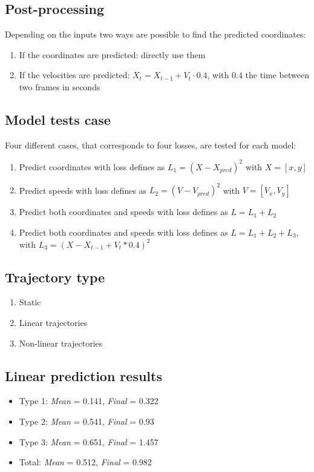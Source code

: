 \documentclass[a0,portrait]{a0poster}
\begin{document}
\begin{multicols}{2}
\subsection*{Post-processing}
Depending on the inputs two ways are possible to find the predicted coordinates:
\begin{enumerate}
\justifying
\item If the coordinates are predicted: directly use them
\item If the velocities are predicted: $X_{t} = X_{t-1} + V_{t}\cdot 0.4$, with $0.4$ the time between two frames in seconds
\end{enumerate}

\subsection*{Model tests case}
Four different cases, that corresponds to four losses, are tested for each model:
\begin{enumerate}
\justifying
\item Predict coordinates with loss defines as $L_1 = (X-X_{pred})^2$ with $X = [x,y]$
\item Predict speeds with loss defines as $L_2 = (V-V_{pred})^2$ with $V = [V_x,V_y]$ 
\item Predict both coordinates and speeds with loss defines as $L = L_1 + L_2$
\item Predict both coordinates and speeds with loss defines as $L = L_1 + L_2 + L_3 $, with $L_3 = (X- X_{t-1} + V_t*0.4)^2$
\end{enumerate}


\begin{minipage}[]{0.5\linewidth}
\subsection*{Trajectory type}
\begin{enumerate}
\justifying
\item Static
\item Linear trajectories
\item Non-linear trajectories
\end{enumerate}
\end{minipage}
\hfill
\begin{minipage}[]{0.5\linewidth}
\subsection*{Linear prediction results}
\begin{itemize}
\item Type 1: \emph{Mean} = 0.141, \emph{Final} = 0.322
\item Type 2: \emph{Mean} = 0.541, \emph{Final} = 0.93
\item Type 3: \emph{Mean} = 0.651, \emph{Final} = 1.457
\item Total: \emph{Mean} = 0.512, \emph{Final} = 0.982 
\end{itemize}
\end{minipage}


\end{multicols}
\end{document}
